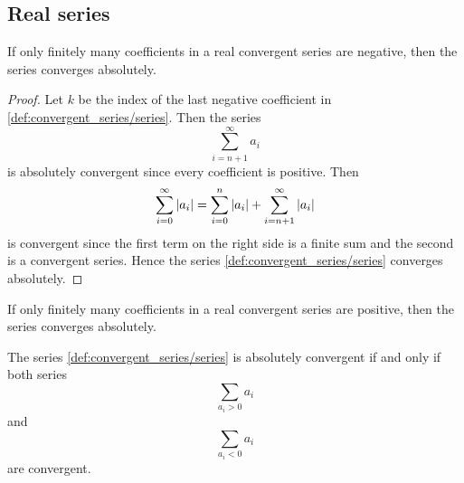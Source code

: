 \subsection{Real series}\label{subsec:real_series}

\begin{proposition}\label{thm:almost_all_terms_positive_implies_absolute_convergent}
  If only finitely many coefficients in a real convergent series are negative, then the series converges absolutely.
\end{proposition}
\begin{proof}
  Let \( k \) be the index of the last negative coefficient in \cref{def:convergent_series/series}. Then the series
  \begin{equation*}
    \sum_{i={n+1}}^\infty a_i
  \end{equation*}
  is absolutely convergent since every coefficient is positive. Then
  \begin{equation*}
    \sum_{i=0}^\infty \left\vert a_i \right\vert = \sum_{i=0}^n \left\vert a_i \right\vert + \sum_{i=n+1}^\infty \left\vert a_i \right\vert
  \end{equation*}
  is convergent since the first term on the right side is a finite sum and the second is a convergent series. Hence the series \cref{def:convergent_series/series} converges absolutely.
\end{proof}

\begin{corollary}\label{thm:almost_all_terms_negative_implies_absolute_convergent}
  If only finitely many coefficients in a real convergent series are positive, then the series converges absolutely.
\end{corollary}

\begin{proposition}\label{thm:series_absolutely_convergent_iff_positive_and_negative_subseries_convergent}
  The series \cref{def:convergent_series/series} is absolutely convergent if and only if both series
  \begin{equation*}
    \sum_{a_i > 0} a_i
  \end{equation*}
  and
  \begin{equation*}
    \sum_{a_i < 0} a_i
  \end{equation*}
  are convergent.
\end{proposition}

